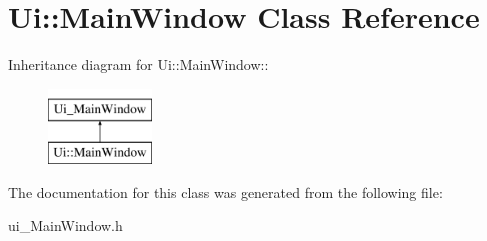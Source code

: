 \hypertarget{classUi_1_1MainWindow}{
\section{Ui::MainWindow Class Reference}
\label{classUi_1_1MainWindow}
}
Inheritance diagram for Ui::MainWindow::\begin{figure}[H]
\begin{center}
\leavevmode
\includegraphics[height=2cm]{classUi_1_1MainWindow}
\end{center}
\end{figure}


The documentation for this class was generated from the following file:\begin{DoxyCompactItemize}
\item 
ui\_\-MainWindow.h\end{DoxyCompactItemize}
